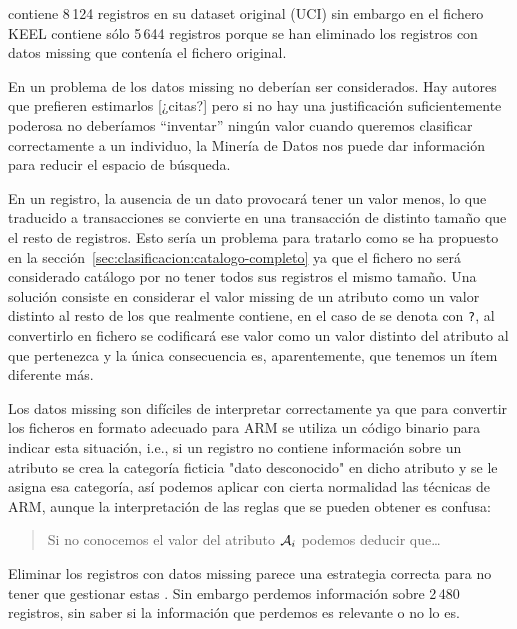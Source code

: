 \ABIERTO
\mushroom contiene 8\,124 registros en su dataset original (UCI) sin embargo en el fichero KEEL contiene sólo 5\,644 registros porque se han eliminado los registros con datos missing que contenía el fichero original.

En un problema de \clasificacion los datos missing no deberían ser considerados. Hay autores que prefieren estimarlos [¿citas?] pero si no hay una justificación suficientemente poderosa no deberíamos ``inventar'' ningún valor cuando queremos clasificar correctamente a un individuo, la Minería de Datos nos puede dar información para reducir el espacio de búsqueda.

En un registro, la ausencia de un dato provocará tener un valor menos, lo que traducido a transacciones se convierte en una transacción de distinto tamaño que el resto de registros. Esto sería un problema para tratarlo como se ha propuesto en la sección~\ref{sec:clasificacion:catalogo-completo} ya que el fichero \D no será considerado catálogo por no tener todos sus registros el mismo tamaño. Una solución consiste en considerar el valor missing de un atributo como un valor distinto al resto de los que realmente contiene, en el caso de \mushroom se denota con \texttt{?}, al convertirlo en fichero \D se codificará ese valor como un valor distinto del atributo al que pertenezca y la única consecuencia es, aparentemente, que tenemos un ítem diferente más.

Los datos missing son difíciles de interpretar correctamente ya que para convertir los ficheros en formato adecuado para ARM se utiliza un código binario para indicar esta situación, i.e., si un registro no contiene información sobre un atributo se crea la categoría ficticia "dato desconocido" en dicho atributo y se le asigna esa categoría, así podemos aplicar con cierta normalidad las técnicas de ARM, aunque la interpretación de las reglas que se pueden obtener es confusa:

\begin{quote}
Si no conocemos el valor del atributo $\A_i$ podemos deducir que\ldots
\end{quote}

Eliminar los registros con datos missing parece una estrategia correcta para no tener que gestionar estas \ars. Sin embargo perdemos información sobre 2\,480 registros, sin saber si la información que perdemos es relevante o no lo es.

